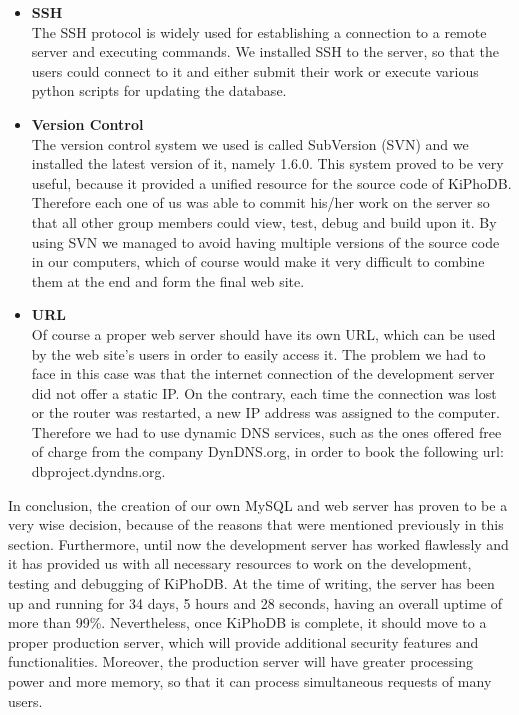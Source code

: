 \begin{itemize}
\item \textbf{SSH} \\
The SSH protocol is widely used for establishing a connection to a remote server and executing commands.
We installed SSH to the server, so that the users could connect to it and either submit their work or execute various python scripts for updating the database.

\item \textbf{Version Control} \\
The version control system we used is called SubVersion (SVN) and we installed the latest version of it, namely 1.6.0.
This system proved to be very useful, because it provided a unified resource for the source code of KiPhoDB.
Therefore each one of us was able to commit his/her work on the server so that all other group members could view, test, debug and build upon it.
By using SVN we managed to avoid having multiple versions of the source code in our computers, which of course would make it very difficult to combine them at the end and form the final web site.

\item \textbf{URL} \\
Of course a proper web server should have its own URL, which can be used by the web site's users in order to easily access it.
The problem we had to face in this case was that the internet connection of the development server did not offer a static IP.
On the contrary, each time the connection was lost or the router was restarted, a new IP address was assigned to the computer.
Therefore we had to use dynamic DNS services, such as the ones offered free of charge from the company DynDNS.org, in order to book the following url: dbproject.dyndns.org.
\end{itemize}

In conclusion, the creation of our own MySQL and web server has proven to be a very wise decision, because of the reasons that were mentioned previously in this section.
Furthermore, until now the development server has worked flawlessly and it has provided us with all necessary resources to work on the development, testing and debugging of KiPhoDB.
At the time of writing, the server has been up and running for 34 days, 5 hours and 28 seconds, having an overall uptime of more than 99\%.
Nevertheless, once KiPhoDB is complete, it should move to a proper production server, which will provide additional security features and functionalities.
Moreover, the production server will have greater processing power and more memory, so that it can process simultaneous requests of many users.

